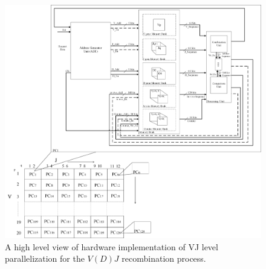 \begin{figure}
\begin{center}
\includegraphics[clip,width=1\columnwidth]{Fig/BIG-Picture_VJLevel.jpg}
\caption{A high level view of hardware implementation of VJ level parallelization for the $V(D)J$ recombination process.}
\label{fig:BIG-Picture_VJLevel}
\end{center}
\end{figure}


